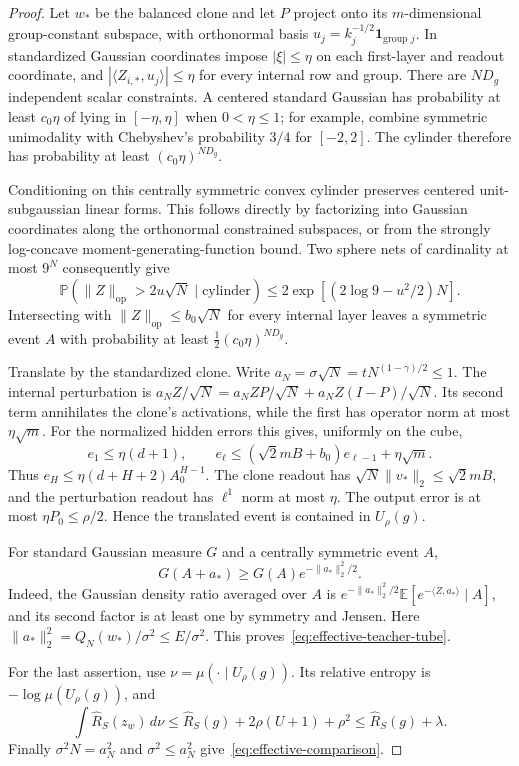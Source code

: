 \begin{proof}
Let $w_*$ be the balanced clone and let $P$ project onto its
$m$-dimensional group-constant subspace, with orthonormal basis
$u_j=k_j^{-1/2}\mathbf1_{\text{group }j}$.  In standardized Gaussian
coordinates impose $|\xi|\leq\eta$ on each first-layer and readout
coordinate, and
$|\langle Z_{i,*},u_j\rangle|\leq\eta$ for every internal row and
group.  There are $ND_g$ independent scalar constraints.  A centered
standard Gaussian has probability at least $c_0\eta$ of lying in
$[-\eta,\eta]$ when $0<\eta\leq1$; for example, combine symmetric
unimodality with Chebyshev's probability $3/4$ for $[-2,2]$.
The cylinder therefore has probability at least $(c_0\eta)^{ND_g}$.

Conditioning on this centrally symmetric convex cylinder preserves
centered unit-subgaussian linear forms.  This follows directly by
factorizing into Gaussian coordinates along the orthonormal constrained
subspaces, or from the strongly log-concave moment-generating-function
bound.  Two sphere nets of cardinality at most $9^N$ consequently give
\[
 \mathbb P(\|Z\|_{\mathrm{op}}>2u\sqrt N\mid\text{cylinder})
 \leq2\exp[(2\log9-u^2/2)N].
\]
Intersecting with $\|Z\|_{\mathrm{op}}\leq b_0\sqrt N$ for every
internal layer leaves a symmetric event $A$ with probability at least
$\tfrac12(c_0\eta)^{ND_g}$.

Translate by the standardized clone.  Write
$a_N=\sigma\sqrt N=tN^{(1-\gamma)/2}\leq1$.
The internal perturbation is
$a_NZ/\sqrt N=a_NZP/\sqrt N+a_NZ(I-P)/\sqrt N$.
Its second term annihilates the clone's activations, while the first
has operator norm at most $\eta\sqrt m$.
For the normalized hidden errors this gives, uniformly on the cube,
\[
 e_1\leq\eta(d+1),\qquad
 e_\ell\leq(\sqrt2mB+b_0)e_{\ell-1}+\eta\sqrt m.
\]
Thus $e_H\leq\eta(d+H+2)A_0^{H-1}$.
The clone readout has $\sqrt N\|v_*\|_2\leq\sqrt2mB$, and the
perturbation readout has $\ell^1$ norm at most $\eta$.
The output error is at most $\eta P_0\leq\rho/2$.
Hence the translated event is contained in $U_\rho(g)$.

For standard Gaussian measure $G$ and a centrally symmetric event $A$,
\[
 G(A+a_*)\geq G(A)e^{-\|a_*\|_2^2/2}.
\]
Indeed, the Gaussian density ratio averaged over $A$ is
$e^{-\|a_*\|_2^2/2}\mathbb E[e^{-\langle Z,a_*\rangle}\mid A]$,
and its second factor is at least one by symmetry and Jensen.
Here $\|a_*\|_2^2=Q_N(w_*)/\sigma^2\leq E/\sigma^2$.
This proves~\eqref{eq:effective-teacher-tube}.

For the last assertion, use $\nu=\mu(\cdot\mid U_\rho(g))$.
Its relative entropy is $-\log\mu(U_\rho(g))$, and
\[
 \int\widehat R_S(z_w)\,d\nu
 \leq\widehat R_S(g)+2\rho(U+1)+\rho^2
 \leq\widehat R_S(g)+\lambda.
\]
Finally $\sigma^2N=a_N^2$ and
$\sigma^2\leq a_N^2$ give~\eqref{eq:effective-comparison}.
\end{proof}
